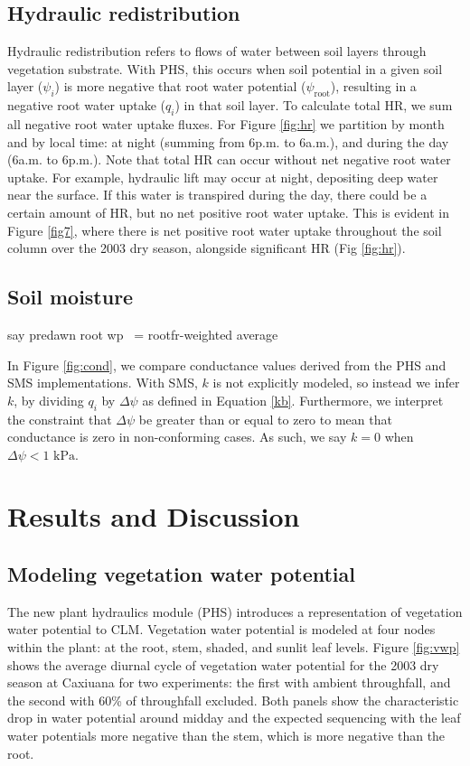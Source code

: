 \documentclass[draft,linenumbers]{agujournal}
\begin{document}
        
\subsection{Hydraulic redistribution}
Hydraulic redistribution refers to flows of water between soil layers through vegetation substrate.
With PHS, this occurs when soil potential in a given soil layer ($\psi_i$) is more negative that root water potential ($\psi_{\text{root}}$), resulting in a negative root water uptake ($q_i$) in that soil layer.
To calculate total HR, we sum all negative root water uptake fluxes.
For Figure \ref{fig:hr} we partition by month and by local time: at night (summing from 6p.m. to 6a.m.), and during the day (6a.m. to 6p.m.).
Note that total HR can occur without net negative root water uptake.
For example, hydraulic lift may occur at night, depositing deep water near the surface.
If this water is transpired during the day, there could be a certain amount of HR, but no net positive root water uptake.
This is evident in Figure \ref{fig7}, where there is net positive root water uptake throughout the soil column over the 2003 dry season, alongside significant HR (Fig \ref{fig:hr}).

\subsection{Soil moisture}
say predawn root wp ~= rootfr-weighted average


    In Figure \ref{fig:cond}, we compare conductance values derived from the PHS and SMS implementations.
    With SMS, $k$ is not explicitly modeled, so instead we infer $k$, 
    by dividing $q_i$ by $\Delta\psi$ as defined in Equation \ref{kb}.
    Furthermore, we interpret the constraint that $\Delta\psi$ be greater than or equal to zero to mean 
    that conductance is zero in non-conforming cases. As such, we say $k=0$ when $\Delta\psi<\text{1 kPa}$.
    

    
\section{Results and Discussion}
\subsection{Modeling vegetation water potential}

The new plant hydraulics module (PHS) introduces a representation of vegetation water potential to CLM.
Vegetation water potential is modeled at four nodes within the plant: at the root, stem, shaded, and sunlit leaf levels.
Figure \ref{fig:vwp} shows the average diurnal cycle of vegetation water potential for the 2003 dry season at Caxiuana for two experiments:
the first with ambient throughfall, and the second with 60\% of throughfall excluded. 
Both panels show the characteristic drop in water potential around midday and the expected sequencing with 
the leaf water potentials more negative than the stem, which is more negative than the root.
\end{document}
